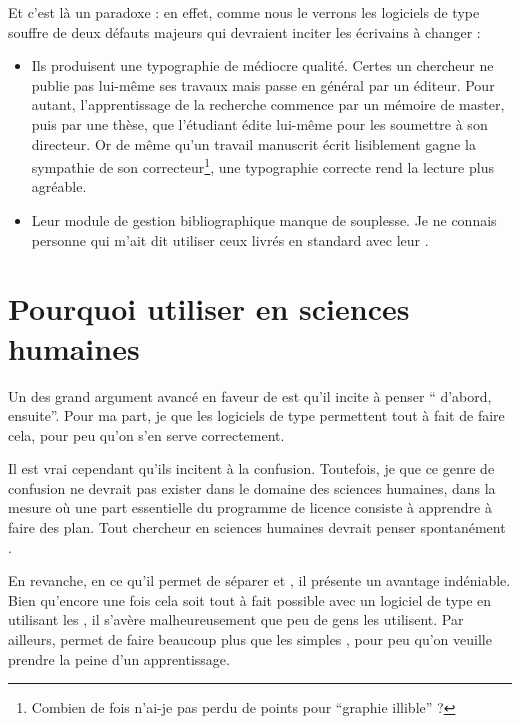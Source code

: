 Et c'est là un paradoxe : en effet, comme nous le verrons les logiciels de type  souffre de deux défauts majeurs qui devraient inciter les écrivains à changer :
\begin{itemize}
\item Ils produisent une typographie de médiocre qualité. Certes un chercheur ne publie pas lui-même ses travaux mais passe en général par un éditeur. Pour autant, l'apprentissage de la recherche commence par un mémoire de master, puis par une thèse, que l'étudiant édite lui-même pour les soumettre à son directeur. Or de même qu'un travail manuscrit écrit lisiblement gagne la sympathie de son correcteur\footnote{Combien de fois n'ai-je pas perdu de points pour \enquote{graphie illible} ?},  une typographie correcte rend la lecture plus agréable.
\item Leur module de gestion bibliographique manque de souplesse. Je ne connais personne qui m'ait dit utiliser ceux livrés en standard avec leur .
\end{itemize}

\section{Pourquoi utiliser  en sciences humaines}

Un des grand argument avancé en faveur de \concept{\LaTeX} est qu'il incite à penser \enquote{ d'abord,  ensuite}. Pour ma part, je que les logiciels de type  permettent tout à fait de faire cela, pour peu qu'on s'en serve correctement. 

Il est vrai cependant qu'ils incitent à la confusion. Toutefois, je que ce genre de confusion ne devrait pas exister dans le domaine des sciences humaines, dans la mesure où une part essentielle du programme de licence consiste à apprendre à faire des plan. Tout chercheur en sciences humaines devrait penser spontanément .

En revanche, en ce qu'il permet de séparer  et , il présente un avantage indéniable. Bien qu'encore une fois cela soit tout à fait possible avec un logiciel de type  en utilisant les ,  il s'avère malheureusement que peu de gens les utilisent. Par ailleurs, \logiciel{\LaTeX} permet de faire beaucoup plus que les simples , pour peu qu'on veuille prendre la peine d'un apprentissage.

